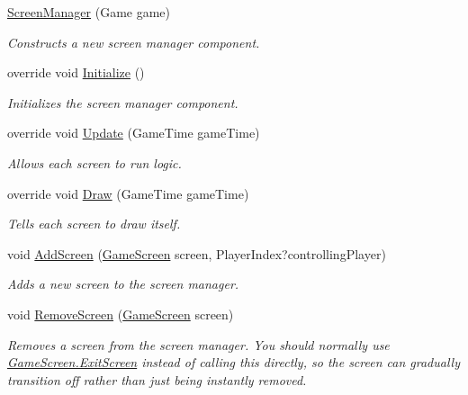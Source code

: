\begin{DoxyCompactItemize}
\item 
\hyperlink{classCityMania_1_1ScreenManager_a00387669cce528d14b1cde5e4cd4caa6}{ScreenManager} (Game game)
\begin{DoxyCompactList}\small\item\em Constructs a new screen manager component. \item\end{DoxyCompactList}\item 
override void \hyperlink{classCityMania_1_1ScreenManager_a3b8674d0e581b9bce7ebfa07431f0ad0}{Initialize} ()
\begin{DoxyCompactList}\small\item\em Initializes the screen manager component. \item\end{DoxyCompactList}\item 
override void \hyperlink{classCityMania_1_1ScreenManager_a1be14955491964faa852cda75eb4da8d}{Update} (GameTime gameTime)
\begin{DoxyCompactList}\small\item\em Allows each screen to run logic. \item\end{DoxyCompactList}\item 
override void \hyperlink{classCityMania_1_1ScreenManager_a6042d9cee57a4285dbd7d84ba0e55171}{Draw} (GameTime gameTime)
\begin{DoxyCompactList}\small\item\em Tells each screen to draw itself. \item\end{DoxyCompactList}\item 
void \hyperlink{classCityMania_1_1ScreenManager_ab7b3df632a850c02161d23308d02bfc3}{AddScreen} (\hyperlink{classCityMania_1_1GameScreen}{GameScreen} screen, PlayerIndex?controllingPlayer)
\begin{DoxyCompactList}\small\item\em Adds a new screen to the screen manager. \item\end{DoxyCompactList}\item 
void \hyperlink{classCityMania_1_1ScreenManager_ae9d2ac095225f11261734ca461847242}{RemoveScreen} (\hyperlink{classCityMania_1_1GameScreen}{GameScreen} screen)
\begin{DoxyCompactList}\small\item\em Removes a screen from the screen manager. You should normally use \hyperlink{classCityMania_1_1GameScreen_ada4a6b75da175b4286662d888eefc3e2}{GameScreen.ExitScreen} instead of calling this directly, so the screen can gradually transition off rather than just being instantly removed. \item\end{DoxyCompactList}\item 

\end{DoxyCompactItemize}
